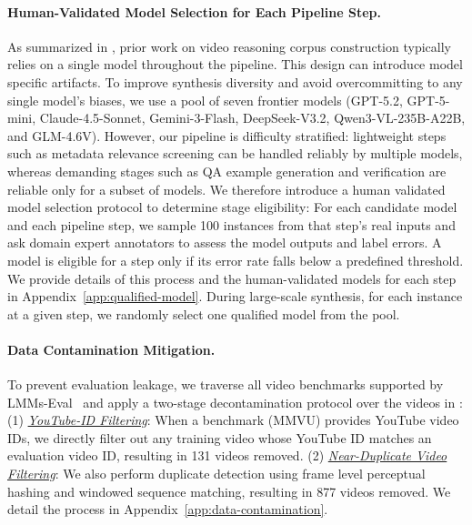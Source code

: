\paragraph{Human-Validated Model Selection for Each Pipeline Step.}
As summarized in , prior work on video reasoning corpus construction typically relies on a single model throughout the pipeline. This design can introduce model specific artifacts.
To improve synthesis diversity and avoid overcommitting to any single model’s biases, we use a pool of seven frontier models (\ie GPT-5.2, GPT-5-mini, Claude-4.5-Sonnet, Gemini-3-Flash, DeepSeek-V3.2, Qwen3-VL-235B-A22B, and GLM-4.6V).
However, our pipeline is difficulty stratified: lightweight steps such as metadata relevance screening can be handled reliably by multiple models, whereas demanding stages such as QA example generation and verification are reliable only for a subset of models.
We therefore introduce a human validated model selection protocol to determine stage eligibility: For each candidate model and each pipeline step, we sample 100 instances from that step’s real inputs and ask domain expert annotators to assess the model outputs and label errors. A model is eligible for a step only if its error rate falls below a predefined threshold.
We provide details of this process and the human-validated models for each step in Appendix~\ref{app:qualified-model}. During large-scale synthesis, for each instance at a given step, we randomly select one qualified model from the pool.

\vspace{-8pt}
\paragraph{Data Contamination Mitigation.}
To prevent evaluation leakage, we traverse all video benchmarks supported by LMMs-Eval~\cite{lmms_eval} and apply a two-stage decontamination protocol over the videos in \ours:
(1) \underline{\emph{YouTube-ID Filtering}}: When a benchmark (\eg MMVU) provides YouTube video IDs, we directly filter out any training video whose YouTube ID matches an evaluation video ID, resulting in 131 videos removed.
(2) \underline{\emph{Near-Duplicate Video Filtering}}: 
We also perform duplicate detection using frame level perceptual hashing and windowed sequence matching, resulting in 877 videos removed. We detail the process in Appendix~\ref{app:data-contamination}.

\vspace{-8pt}
